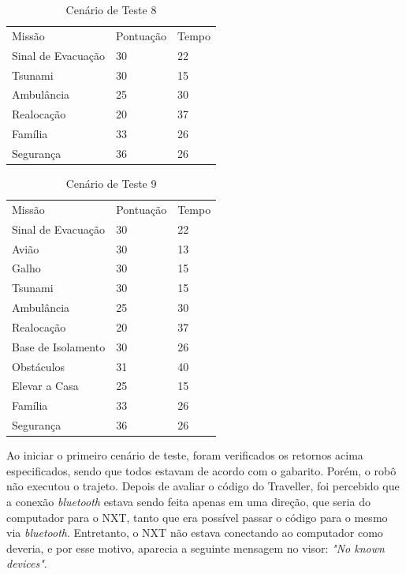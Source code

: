 \begin{table}[!h]
\centering
\caption{Cenário de Teste 8}
\label{cenario8}
\begin{tabular}{lll}
Missão             & Pontuação & Tempo \\
Sinal de Evacuação & 30        & 22    \\
Tsunami            & 30        & 15    \\
Ambulância         & 25        & 30    \\
Realocação         & 20        & 37    \\
Família            & 33        & 26    \\
Segurança          & 36        & 26   
\end{tabular}
\end{table}

\begin{table}[!h]
\centering
\caption{Cenário de Teste 9}
\label{cenario09}
\begin{tabular}{lll}
Missão             & Pontuação & Tempo \\
Sinal de Evacuação & 30        & 22    \\
Avião              & 30        & 13    \\
Galho              & 30        & 15    \\
Tsunami            & 30        & 15    \\
Ambulância         & 25        & 30    \\
Realocação         & 20        & 37    \\
Base de Isolamento & 30        & 26    \\
Obstáculos         & 31        & 40    \\
Elevar a Casa      & 25        & 15    \\
Família            & 33        & 26    \\
Segurança          & 36        & 26   
\end{tabular}
\end{table}
\clearpage

	Ao iniciar o primeiro cenário de teste, foram verificados os retornos acima especificados, sendo que todos estavam de acordo com o gabarito. Porém, o robô não executou o trajeto. Depois de avaliar o código do Traveller, foi percebido que a conexão \textit{bluetooth} estava sendo feita apenas em uma direção, que seria do computador para o NXT, tanto que era possível passar o código para o mesmo via \textit{bluetooth}. Entretanto, o NXT não estava conectando ao computador como deveria, e por esse motivo, aparecia a seguinte mensagem no visor: \textit{"No known devices"}.

